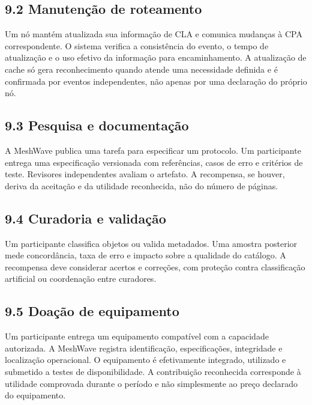 \documentclass[12pt,a4paper]{article}
\begin{document}
\subsection{9.2 Manutenção de roteamento}

Um nó mantém atualizada sua informação de CLA e comunica mudanças à CPA correspondente. O sistema verifica a consistência do evento, o tempo de atualização e o uso efetivo da informação para encaminhamento. A atualização de cache só gera reconhecimento quando atende uma necessidade definida e é confirmada por eventos independentes, não apenas por uma declaração do próprio nó.\\

\subsection{9.3 Pesquisa e documentação}

A MeshWave publica uma tarefa para especificar um protocolo. Um participante entrega uma especificação versionada com referências, casos de erro e critérios de teste. Revisores independentes avaliam o artefato. A recompensa, se houver, deriva da aceitação e da utilidade reconhecida, não do número de páginas.\\

\subsection{9.4 Curadoria e validação}

Um participante classifica objetos ou valida metadados. Uma amostra posterior mede concordância, taxa de erro e impacto sobre a qualidade do catálogo. A recompensa deve considerar acertos e correções, com proteção contra classificação artificial ou coordenação entre curadores.\\

\subsection{9.5 Doação de equipamento}

Um participante entrega um equipamento compatível com a capacidade autorizada. A MeshWave registra identificação, especificações, integridade e localização operacional. O equipamento é efetivamente integrado, utilizado e submetido a testes de disponibilidade. A contribuição reconhecida corresponde à utilidade comprovada durante o período e não simplesmente ao preço declarado do equipamento.\\
\end{document}
